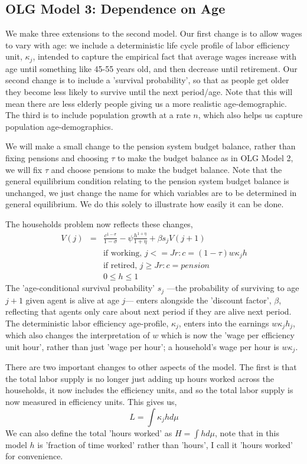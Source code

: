 \subsection{OLG Model 3: Dependence on Age}
We make three extensions to the second model. Our first change is to allow wages to vary with age: we include a deterministic life cycle profile of labor efficiency unit, $\kappa_j$, intended to capture the empirical fact that average wages increase with age until something like 45-55 years old, and then decrease until retirement. Our second change is to include a 'survival probability', so that as people get older they become less likely to survive until the next period/age. Note that this will mean there are less elderly people giving us a more realistic age-demographic. The third is to include population growth at a rate $n$, which also helps us capture population age-demographics.

We will make a small change to the pension system budget balance, rather than fixing pensions and choosing $\tau$ to make the budget balance as in OLG Model 2, we will fix $\tau$ and choose pensions to make the budget balance. Note that the general equilibrium condition relating to the pension system budget balance is unchanged, we just change the name for which variables are to be determined in general equilibrium. We do this solely to illustrate how easily it can be done.

The households problem now reflects these changes,
\begin{eqnarray*}
 V(j)&=& \frac{c^{1-\sigma}}{1-\sigma} - \psi \frac{h^{1+\eta}}{1+\eta}  + \beta s_j V(j+1) \\
&&\text{if working, }j<=Jr: c=(1-\tau) w \kappa_j h \\
&&\text{if retired, }j\geq Jr: c=pension \\
&& 0\leq h \leq 1
\end{eqnarray*}
The 'age-conditional survival probability' $s_j$ ---the probability of surviving to age $j+1$ given agent is alive at age $j$--- enters alongside the 'discount factor', $\beta$, reflecting that agents only care about next period if they are alive next period. The deterministic labor efficiency age-profile, $\kappa_j$, enters into the earnings $w \kappa_j h_j$, which also changes the interpretation of $w$ which is now the 'wage per efficiency unit hour', rather than just 'wage per hour'; a household's wage per hour is $w \kappa_j$.

There are two important changes to other aspects of the model. The first is that the total labor supply is no longer just adding up hours worked across the households, it now includes the efficiency units, and so the total labor supply is now measured in efficiency units. This gives us,
\begin{equation*}
 L=\int \kappa_j h d\mu
\end{equation*}
We can also define the total 'hours worked' as $H=\int h d\mu$, note that in this model $h$ is 'fraction of time worked' rather than 'hours', I call it 'hours worked' for convenience.

